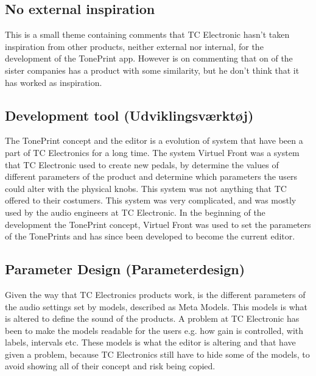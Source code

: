 \subsection*{No external inspiration}
\label{App:ThemeNoExternalInspiration}


This is a small theme containing comments that TC Electronic hasn't taken inspiration from other products, neither external nor internal, for the development of the TonePrint app. However is on commenting that on of the sister companies has a product with some similarity, but he don't think that it has worked as inspiration.







\subsection*{Development tool (Udviklingsværktøj)}
\label{ThemeDevelopmentTool}
The TonePrint concept and the editor is a evolution of system that have been a part of TC Electronics for a long time. The system Virtuel Front was a system that TC Electronic used to create new pedals, by determine the values of different parameters of the product and determine which parameters the users could alter with the physical knobs. This system was not anything that TC offered to their costumers. This system was very complicated, and was mostly used by the audio engineers at TC Electronic. In the beginning of the development the TonePrint concept, Virtuel Front was used to set the parameters of the TonePrints and has since been developed to become the current editor. 

\subsection*{Parameter Design (Parameterdesign)}
\label{ThemeParameterDesign}
Given the way that TC Electronics products work, is the different parameters of the audio settings set by models, described as Meta Models. This models is what is altered to define the sound of the products. A problem at TC Electronic has been to make the models readable for the users e.g. how gain is controlled, with labels, intervals etc. These models is what the editor is altering and that have given a problem, because TC Electronics still have to hide some of the models, to avoid showing all of their concept and risk being copied. 

